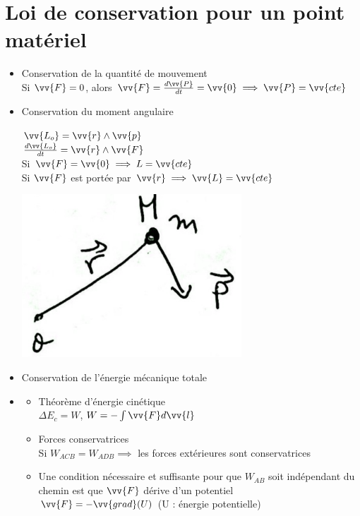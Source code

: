 \documentclass[12pt,oneside]{book}
\begin{document}
\section{Loi de conservation pour un point matériel}
\begin{itemize}
    \item Conservation de la quantité de mouvement \\
    Si $\vv{F} = 0$, alors $\vv{F} = \frac{d\vv{P}}{dt} = \vv{0} \implies \vv{P} = \vv{cte}$
    \item Conservation du moment angulaire
    \begin{center}
        \begin{minipage}{0.49\linewidth}
            $\vv{L_o} = \vv{r} \wedge \vv{p}$ \\
            $\frac{d\vv{L_o}}{dt} = \vv{r} \wedge \vv{F}$ \\
            Si $\vv{F} = \vv{0} \implies L = \vv{cte}$ \\
            Si $\vv{F}$ est portée par $\vv{r} \implies \vv{L} = \vv{cte}$
        \end{minipage}
        \begin{minipage}{0.39\linewidth}
            \includegraphics[width=\linewidth]{../pic/2204/conservationmomentangulair.png}
        \end{minipage}
    \end{center}
    \item Conservation de l'énergie mécanique totale
    \item
    \begin{itemize}
        \item Théorème d'énergie cinétique \\
        $\Delta E_c = W$, $W = -\int\vv{F}d\vv{l}$
        \item Forces conservatrices \\
        Si $W_{ACB} = W_{ADB} \implies$ les forces extérieures sont conservatrices
        \item Une condition nécessaire et suffisante pour que $W_{AB}$ soit indépendant du chemin est que $\vv{F}$ dérive d'un potentiel \\
        $\vv{F} = -\vv{grad}(U)$ (U : énergie potentielle)
    \end{itemize}
\end{itemize}
\pagebreak
\end{document}
